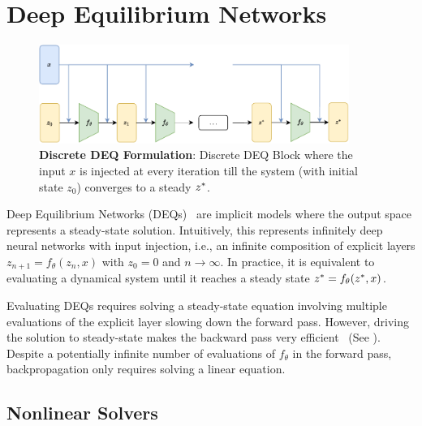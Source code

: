\section{Deep Equilibrium Networks}
\label{sec:deep_equilibrium_networks}

\begin{figure}[t]
  \centering
  \includegraphics[width=0.9\textwidth]{../figures/deep_equilibrium_models/model_architecture.pdf}
  \caption{\textbf{Discrete DEQ Formulation}: Discrete DEQ Block where the input $x$ is injected at every iteration till the system (with initial state $z_0$) converges to a steady $z^*$.}
  \label{fig:model_architecture_discrete_deq}
\end{figure}

Deep Equilibrium Networks (DEQs)~\citep{bai_deep_2019} are implicit models where the output space represents a steady-state solution. Intuitively, this represents infinitely deep neural networks with input injection, i.e., an infinite composition of explicit layers $z_{n + 1} = f_\theta(z_n, x)$ with $z_0 = 0$ and $n \rightarrow \infty$. In practice, it is equivalent to evaluating a dynamical system until it reaches a steady state $z^* = f_\theta(z^*, x)$.


Evaluating DEQs requires solving a steady-state equation involving multiple evaluations of the explicit layer slowing down the forward pass. However, driving the solution to steady-state makes the backward pass very efficient~\citep{johnson2012notes} (See ). Despite a potentially infinite number of evaluations of $f_\theta$ in the forward pass, backpropagation only requires solving a linear equation.

\subsection{Nonlinear Solvers}
\label{subsec:nonlinear_solvers_deqs}

